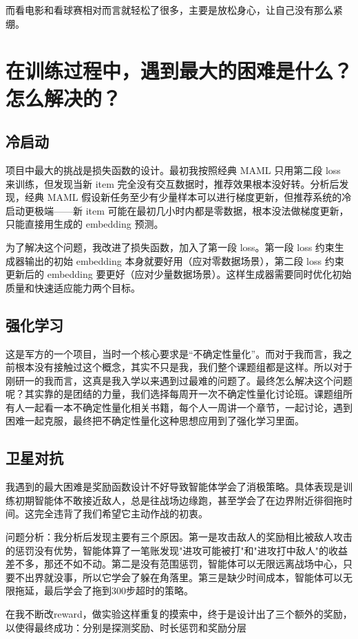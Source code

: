 \documentclass[12pt,a4paper]{article}
\begin{document}
而看电影和看球赛相对而言就轻松了很多，主要是放松身心，让自己没有那么紧绷。


\section{在训练过程中，遇到最大的困难是什么？怎么解决的？}
\subsection{冷启动}
项目中最大的挑战是损失函数的设计。最初我按照经典 MAML 只用第二段 loss 来训练，但发现当新 item 完全没有交互数据时，推荐效果根本没好转。分析后发现，经典 MAML 假设新任务至少有少量样本可以进行梯度更新，但推荐系统的冷启动更极端——新 item 可能在最初几小时内都是零数据，根本没法做梯度更新，只能直接用生成的 embedding 预测。

为了解决这个问题，我改进了损失函数，加入了第一段 loss。第一段 loss 约束生成器输出的初始 embedding 本身就要好用（应对零数据场景），第二段 loss 约束更新后的 embedding 要更好（应对少量数据场景）。这样生成器需要同时优化初始质量和快速适应能力两个目标。
\subsection{强化学习}
这是军方的一个项目，当时一个核心要求是“不确定性量化”。而对于我而言，我之前根本没有接触过这个概念，其实不只是我，我们整个课题组都是这样。所以对于刚研一的我而言，这真是我入学以来遇到过最难的问题了。最终怎么解决这个问题呢？其实靠的是团结的力量，我们选择每周开一次不确定性量化讨论班。课题组所有人一起看一本不确定性量化相关书籍，每个人一周讲一个章节，一起讨论，遇到困难一起克服，最终把不确定性量化这种思想应用到了强化学习里面。
\subsection{卫星对抗}
我遇到的最大困难是奖励函数设计不好导致智能体学会了消极策略。具体表现是训练初期智能体不敢接近敌人，总是往战场边缘跑，甚至学会了在边界附近徘徊拖时间。这完全违背了我们希望它主动作战的初衷。

问题分析：我分析后发现主要有三个原因。第一是攻击敌人的奖励相比被敌人攻击的惩罚没有优势，智能体算了一笔账发现"进攻可能被打"和"进攻打中敌人"的收益差不多，那还不如不动。第二是没有范围惩罚，智能体可以无限远离战场中心，只要不出界就没事，所以它学会了躲在角落里。第三是缺少时间成本，智能体可以无限拖延，最后学会了拖到300步超时的策略。

在我不断改reward，做实验这样重复的摸索中，终于是设计出了三个额外的奖励，以使得最终成功：分别是探测奖励、时长惩罚和奖励分层
\end{document}
